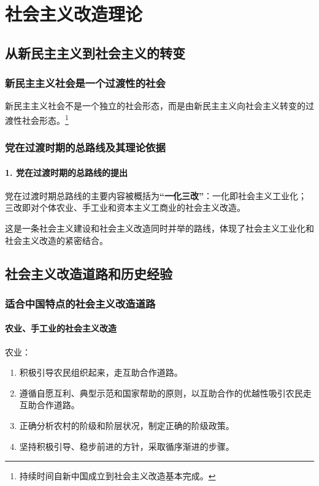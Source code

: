 \chapter{社会主义改造理论}\label{Chapter:社会主义改造理论}


\section{从新民主主义到社会主义的转变}

    \subsection{新民主主义社会是一个过渡性的社会}
    新民主主义社会不是一个独立的社会形态，而是由新民主主义向社会主义转变的过渡性社会形态。\footnote{持续时间自新中国成立到社会主义改造基本完成。}

    \subsection{党在过渡时期的总路线及其理论依据}
        \subsubsection{1. 党在过渡时期的总路线的提出}
        党在过渡时期总路线的主要内容被概括为\textbf{“一化三改”}：一化即社会主义工业化；三改即对个体农业、手工业和资本主义工商业的社会主义改造。

        这是一条社会主义建设和社会主义改造同时并举的路线，体现了社会主义工业化和社会主义改造的紧密结合。


\section{社会主义改造道路和历史经验}

    \subsection{适合中国特点的社会主义改造道路}
        \subsubsection{农业、手工业的社会主义改造}
        农业：
        \begin{enumerate}
            \item 积极引导农民组织起来，走互助合作道路。
            \item 遵循自愿互利、典型示范和国家帮助的原则，以互助合作的优越性吸引农民走互助合作道路。
            \item 正确分析农村的阶级和阶层状况，制定正确的阶级政策。
            \item 坚持积极引导、稳步前进的方针，采取循序渐进的步骤。
        \end{enumerate}

